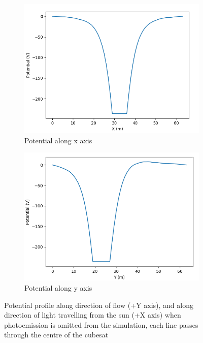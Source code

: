 \begin{figure}[H]
  \begin{subfigure}[b]{0.61\textwidth}
    \includegraphics[width=\textwidth]{figures/DECA/NoPhotoelectrons/potentialAlongX.PNG}
    \caption{Potential along x axis}
    \label{fig:noPHalongX}
  \end{subfigure}
  \begin{subfigure}[b]{0.61\textwidth}
    \includegraphics[width=\textwidth]{figures/DECA/NoPhotoelectrons/potentialAlongY.PNG}
    \caption{Potential along y axis}
    \label{fig:noPHalongY}
  \end{subfigure}
  \label{fig:NOPH}
  \caption{Potential profile along direction of flow (+Y axis), and along direction of light travelling from the sun (+X axis) when photoemission is omitted from the simulation, each line passes through the centre of the cubesat}
\end{figure}


